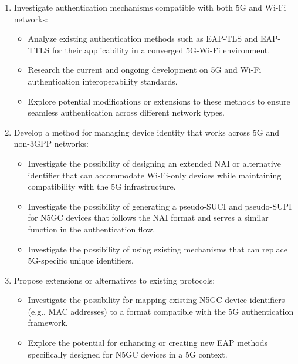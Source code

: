 \begin{enumerate}
    \item{
        Investigate authentication mechanisms compatible with both \ac{5G} and Wi-Fi networks:
        \begin{itemize}
            \item {
                Analyze existing authentication methods such as \ac{EAP-TLS} and \ac{EAP-TTLS} for their applicability in a converged \ac{5G}-Wi-Fi environment.
            }
            \item {
                Research the current and ongoing development on \ac{5G} and Wi-Fi authentication interoperability standards.
            }
            \item {
                Explore potential modifications or extensions to these methods to ensure seamless authentication across different network types.
            }
        \end{itemize}
    }
    \item{
        Develop a method for managing device identity that works across \ac{5G} and non-\ac{3GPP} networks:
        \begin{itemize}
            \item Investigate the possibility of designing an extended \ac{NAI} or alternative identifier that can accommodate Wi-Fi-only devices while maintaining compatibility with the \ac{5G} infrastructure.
            
            \item Investigate the possibility of generating a pseudo-\acf{SUCI} and pseudo-\ac{SUPI} for \ac{N5GC} devices that follows the \ac{NAI} format and serves a similar function in the authentication flow.

            \item Investigate the possibility of using existing mechanisms that can replace \ac{5G}-specific unique identifiers.
        \end{itemize}
    }
    \item{
        Propose extensions or alternatives to existing protocols:
        \begin{itemize}
            \item Investigate the possibility for mapping existing \ac{N5GC} device identifiers (e.g., \ac{MAC} addresses) to a format compatible with the \ac{5G} authentication framework.
            \item Explore the potential for enhancing or creating new \ac{EAP} methods specifically designed for \ac{N5GC} devices in a \ac{5G} context.
        \end{itemize}
    }
\end{enumerate}

